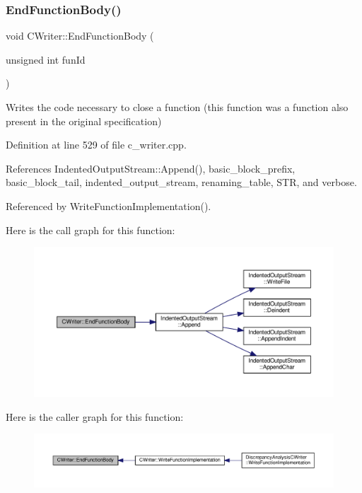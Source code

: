 \subsubsection{\texorpdfstring{End\+Function\+Body()}{EndFunctionBody()}}
{\footnotesize\ttfamily void C\+Writer\+::\+End\+Function\+Body (\begin{DoxyParamCaption}\item[{unsigned int}]{fun\+Id }\end{DoxyParamCaption})\hspace{0.3cm}{\ttfamily [virtual]}}



Writes the code necessary to close a function (this function was a function also present in the original specification) 



Definition at line 529 of file c\+\_\+writer.\+cpp.



References Indented\+Output\+Stream\+::\+Append(), basic\+\_\+block\+\_\+prefix, basic\+\_\+block\+\_\+tail, indented\+\_\+output\+\_\+stream, renaming\+\_\+table, S\+TR, and verbose.



Referenced by Write\+Function\+Implementation().

Here is the call graph for this function\+:
\nopagebreak
\begin{figure}[H]
\begin{center}
\leavevmode
\includegraphics[width=350pt]{d3/d59/classCWriter_aac63c089d71f0541d08bf3790a829645_cgraph}
\end{center}
\end{figure}
Here is the caller graph for this function\+:
\nopagebreak
\begin{figure}[H]
\begin{center}
\leavevmode
\includegraphics[width=350pt]{d3/d59/classCWriter_aac63c089d71f0541d08bf3790a829645_icgraph}
\end{center}
\end{figure}
\mbox{\label{classCWriter_a6a794a93c30937aa0ce70de98f5bb8c7}} 
